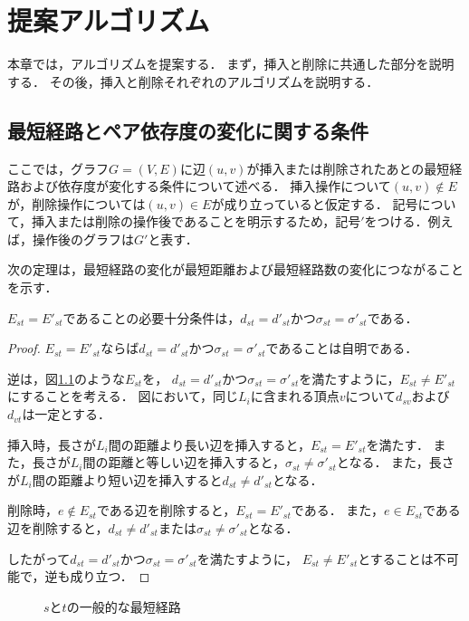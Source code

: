 \chapter{提案アルゴリズム}
\label{chap:algorithm}

本章では，アルゴリズムを提案する．
まず，挿入と削除に共通した部分を説明する．
その後，挿入と削除それぞれのアルゴリズムを説明する．

\section{最短経路とペア依存度の変化に関する条件}
\label{sect:condition-of-variability}

ここでは，グラフ$G=(V,E)$に辺$(u,v)$が挿入または削除されたあとの最短経路および依存度が変化する条件について述べる．
挿入操作について$(u,v)\notin E$が，削除操作については$(u,v)\in E$が成り立っていると仮定する．
記号について，挿入または削除の操作後であることを明示するため，記号$'$をつける．例えば，操作後のグラフは$G'$と表す．

次の定理は，最短経路の変化が最短距離および最短経路数の変化につながることを示す．
\begin{theorem}
  \label{thm:condition-of-invariability-of-shortest-path}
  $E_{st}=E'_{st}$であることの必要十分条件は，$d_{st}=d'_{st}$かつ$\sigma_{st}=\sigma'_{st}$である．
\end{theorem}
\begin{proof}
  $E_{st}=E'_{st}$ならば$d_{st}=d'_{st}$かつ$\sigma_{st}=\sigma'_{st}$であることは自明である．

  逆は，図\ref{fig:proof-invariability-of-paths}のような$E_{st}$を，
  $d_{st}=d'_{st}$かつ$\sigma_{st}=\sigma'_{st}$を満たすように，$E_{st}\neq E'_{st}$にすることを考える．
  図において，同じ$L_i$に含まれる頂点$v$について$d_{sv}$および$d_{vt}$は一定とする．

  挿入時，長さが$L_i$間の距離より長い辺を挿入すると，$E_{st}=E'_{st}$を満たす．
  また，長さが$L_i$間の距離と等しい辺を挿入すると，$\sigma_{st}\neq\sigma'_{st}$となる．
  また，長さが$L_i$間の距離より短い辺を挿入すると$d_{st}\neq d'_{st}$となる．

  削除時，$e\notin E_{st}$である辺を削除すると，$E_{st}=E'_{st}$である．
  また，$e\in E_{st}$である辺を削除すると，$d_{st}\neq d'_{st}$または$\sigma_{st}\neq\sigma'_{st}$となる．

  したがって$d_{st}=d'_{st}$かつ$\sigma_{st}=\sigma'_{st}$を満たすように，
  $E_{st}\neq E'_{st}$とすることは不可能で，逆も成り立つ．

\end{proof}
\begin{figure}
  \centering
  \def\svgwidth{.5\columnwidth}
  
  \caption{$s$と$t$の一般的な最短経路}
  \label{fig:proof-invariability-of-paths}
\end{figure}


